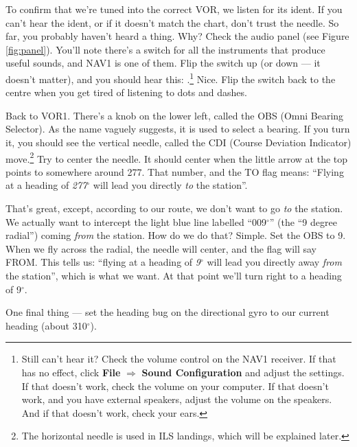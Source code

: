To confirm that we're tuned into the correct VOR, we listen for its
ident.  If you can't hear the ident, or if it doesn't match the chart,
don't trust the needle.  So far, you probably haven't heard a thing.
Why?  Check the audio panel (see Figure \ref{fig:panel}).  You'll note
there's a switch for all the instruments that produce useful sounds,
and NAV1 is one of them.  Flip the switch up (or down --- it doesn't
matter), and you should hear this: \mdot\mdot\mdot\mspace
\mdot\mdash\mdash\mdash\mspace \mdash\mdot\mdash\mdot.\footnote{Still
  can't hear it?  Check the volume control on the NAV1 receiver.  If
  that has no effect, click \textbf{\textsf{File}} $\Rightarrow$
  \textbf{\textsf{Sound Configuration}} and adjust the settings.  If
  that doesn't work, check the volume on your computer.  If that
  doesn't work, and you have external speakers, adjust the volume on
  the speakers.  And if that doesn't work, check your ears.} Nice.
Flip the switch back to the centre when you get tired of listening to
dots and dashes.



Back to VOR1.  There's a knob on the lower left, called the OBS (Omni
Bearing Selector).  As the name vaguely suggests, it is used to select
a bearing.  If you turn it, you should see the vertical needle, called
the CDI (Course Deviation Indicator) move.\footnote{The horizontal
  needle is used in ILS landings, which will be explained later.}  Try
to center the needle.  It should center when the little arrow at the
top points to somewhere around 277.  That number, and the TO flag
means: ``Flying at a heading of \emph{277$^\circ$} will lead you
directly \emph{to} the station''.

That's great, except, according to our route, we don't want to go
\emph{to} the station.  We actually want to intercept the light blue
line labelled ``009$^\circ$'' (the ``9 degree radial'') coming
\emph{from} the station.  How do we do that?  Simple.  Set the OBS to
9.  When we fly across
the radial, the needle will center, and the flag will say FROM.  This
tells us: ``flying at a heading of \emph{9$^\circ$} will lead you
directly away \emph{from} the station'', which is what we want.  At
that point we'll turn right to a heading of 9$^\circ$.

One final thing --- set the heading bug on the directional gyro to our
current heading (about 310$^\circ$).

